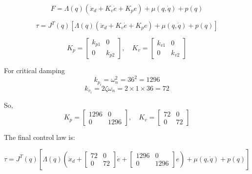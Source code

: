 \documentclass{article}
\begin{document}
\[
F = \Lambda(q) (\ddot{x}_d + K_v \dot{e} + K_p e) + \mu(q, \dot{q}) + p(q)
\]

\[
\tau = J^{T}(q) \left[ \Lambda(q) (\ddot{x}_d + K_v \dot{e} + K_p e) + \mu(q, \dot{q}) + p(q) \right]
\]

\[
K_p = \begin{bmatrix} k_{p1} & 0 \\ 0 & k_{p2} \end{bmatrix}, \quad K_v = \begin{bmatrix} k_{v1} & 0 \\ 0 & k_{v2} \end{bmatrix}
\]

For critical damping 
\[
k_{p_i} = \omega_n^2 = 36^2 = 1296
\]
\[
k_{v_i} = 2 \zeta \omega_n = 2 \times 1 \times 36 = 72
\]

So,
\[
K_p = \begin{bmatrix} 1296 & 0 \\ 0 & 1296 \end{bmatrix}, \quad K_v = \begin{bmatrix} 72 & 0 \\ 0 & 72 \end{bmatrix}
\]

The final control law is:

\[
\tau = J^{T}(q) \left[ \Lambda(q) (\ddot{x}_d + \begin{bmatrix} 72 & 0 \\ 0 & 72 \end{bmatrix} \dot{e} + \begin{bmatrix} 1296 & 0 \\ 0 & 1296 \end{bmatrix} e) + \mu(q, \dot{q}) + p(q) \right]
\]
\end{document}
